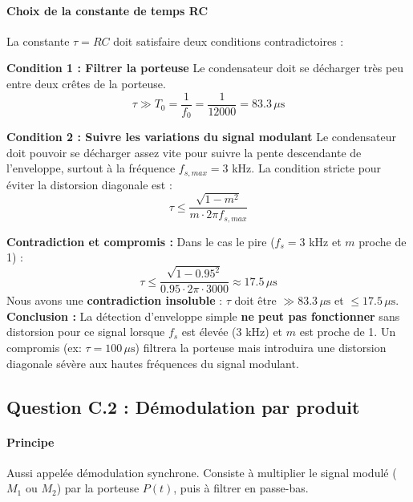 \documentclass[11pt,a4paper]{article}
\begin{document}
\paragraph{Choix de la constante de temps RC}
La constante $\tau = RC$ doit satisfaire deux conditions contradictoires :

\textbf{Condition 1 : Filtrer la porteuse}
Le condensateur doit se décharger très peu entre deux crêtes de la porteuse.
\begin{equation}
\tau \gg T_0 = \frac{1}{f_0} = \frac{1}{12000} = 83.3 \, \mu\text{s}
\end{equation}

\textbf{Condition 2 : Suivre les variations du signal modulant}
Le condensateur doit pouvoir se décharger assez vite pour suivre la pente descendante de l'enveloppe, surtout à la fréquence $f_{s,max} = 3$ kHz. La condition stricte pour éviter la distorsion diagonale est :
\begin{equation}
\tau \leq \frac{\sqrt{1-m^2}}{m \cdot 2\pi f_{s,max}}
\end{equation}

\textbf{Contradiction et compromis :}
Dans le cas le pire ($f_s = 3$ kHz et $m$ proche de 1) :
\begin{equation}
\tau \leq \frac{\sqrt{1-0.95^2}}{0.95 \cdot 2\pi \cdot 3000} \approx 17.5 \, \mu\text{s}
\end{equation}
Nous avons une \textbf{contradiction insoluble} : $\tau$ doit être $\gg 83.3 \, \mu\text{s}$ et $\leq 17.5 \, \mu\text{s}$.
\textbf{Conclusion :} La détection d'enveloppe simple \textbf{ne peut pas fonctionner} sans distorsion pour ce signal lorsque $f_s$ est élevée (3 kHz) et $m$ est proche de 1.
Un compromis (ex: $\tau = 100 \, \mu\text{s}$) filtrera la porteuse mais introduira une distorsion diagonale sévère aux hautes fréquences du signal modulant.

\subsection{Question C.2 : Démodulation par produit}

\paragraph{Principe}
Aussi appelée démodulation synchrone. Consiste à multiplier le signal modulé ($M_1$ ou $M_2$) par la porteuse $P(t)$, puis à filtrer en passe-bas.
\end{document}
